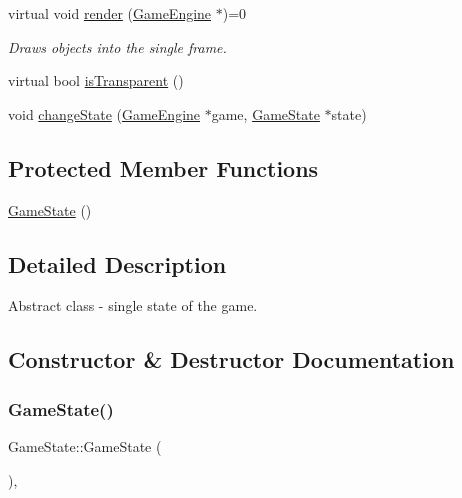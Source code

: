 \begin{DoxyCompactItemize}
virtual void \mbox{\hyperlink{class_game_state_a0d56cd5355f59a87cf95e1c6d719f329}{render}} (\mbox{\hyperlink{class_game_engine}{Game\+Engine}} $\ast$)=0
\begin{DoxyCompactList}\small\item\em Draws objects into the single frame. \end{DoxyCompactList}\item 
virtual bool \mbox{\hyperlink{class_game_state_af75d6db30190901ed70704d18804fac7}{is\+Transparent}} ()
\item 
void \mbox{\hyperlink{class_game_state_a5f4ffcaa495af37ba423627e3f961fdb}{change\+State}} (\mbox{\hyperlink{class_game_engine}{Game\+Engine}} $\ast$game, \mbox{\hyperlink{class_game_state}{Game\+State}} $\ast$state)
\end{DoxyCompactItemize}
\subsection*{Protected Member Functions}
\begin{DoxyCompactItemize}
\item 
\mbox{\hyperlink{class_game_state_a4fa0a2bf50315c4a35a3890a0adcee5c}{Game\+State}} ()
\end{DoxyCompactItemize}


\subsection{Detailed Description}
Abstract class -\/ single state of the game. 

\subsection{Constructor \& Destructor Documentation}
\mbox{\label{class_game_state_a4fa0a2bf50315c4a35a3890a0adcee5c}} 
\subsubsection{\texorpdfstring{GameState()}{GameState()}}
{\footnotesize\ttfamily Game\+State\+::\+Game\+State (\begin{DoxyParamCaption}{ }\end{DoxyParamCaption})\hspace{0.3cm}{\ttfamily [inline]}, {\ttfamily [protected]}}




